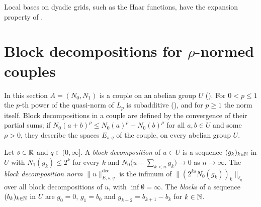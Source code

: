 Local bases on dyadic grids, such as the Haar functions, have the expansion property of
.

\section{Block decompositions for \texorpdfstring{$\rho$}{rho}-normed couples}
\label{sec:e-block-decompositions}

In this section $A = (N_0, N_1)$ is a couple on an abelian group $U$ (). For
$0 < p \leq 1$ the $p$-th power of the quasi-norm of $L_p$ is subadditive
(), and for $p \geq 1$ the norm itself. Block decompositions in a
couple are defined by the convergence of their partial sums; if
$N_0(a + b)^\rho \leq N_0(a)^\rho + N_0(b)^\rho$ for all $a, b \in U$ and some $\rho > 0$, they
describe the spaces $E_{s,q}$ of the couple, on every abelian group $U$.

\begin{definition}
\label{def:e-block-decomposition}
\leanok
{}
Let $s \in \mathbb{R}$ and $q \in (0, \infty]$. A \emph{block decomposition} of $u \in U$ is a sequence
$(g_k)_{k \in \mathbb{N}}$ in $U$ with $N_1(g_k) \leq 2^k$ for every $k$ and
$N_0\bigl(u - \sum_{k<n} g_k\bigr) \to 0$ as $n \to \infty$. The \emph{block decomposition norm}
$\|u\|^{\mathrm{dec}}_{E, s, q}$ is the infimum of $\|(2^{ks} N_0(g_k))_k\|_{\ell_q}$ over all
block decompositions of $u$, with $\inf \emptyset = \infty$. The \emph{blocks} of a sequence
$(b_k)_{k \in \mathbb{N}}$ in $U$ are $g_0 = 0$, $g_1 = b_0$ and $g_{k+2} = b_{k+1} - b_k$ for
$k \in \mathbb{N}$.
\end{definition}

